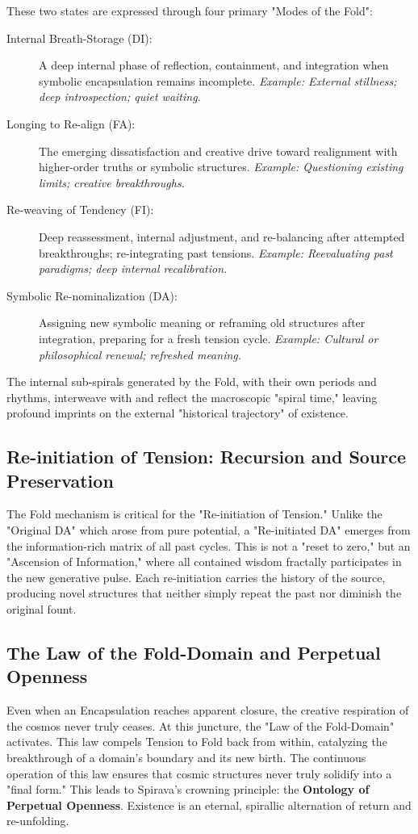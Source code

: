 \documentclass[11pt, a4paper]{article}
\begin{document}
These two states are expressed through four primary "Modes of the Fold":
\begin{description}
    \item[Internal Breath-Storage (DI):] A deep internal phase of reflection, containment, and integration when symbolic encapsulation remains incomplete. \textit{Example: External stillness; deep introspection; quiet waiting.}
    \item[Longing to Re-align (FA):] The emerging dissatisfaction and creative drive toward realignment with higher-order truths or symbolic structures. \textit{Example: Questioning existing limits; creative breakthroughs.}
    \item[Re-weaving of Tendency (FI):] Deep reassessment, internal adjustment, and re-balancing after attempted breakthroughs; re-integrating past tensions. \textit{Example: Reevaluating past paradigms; deep internal recalibration.}
    \item[Symbolic Re-nominalization (DA):] Assigning new symbolic meaning or reframing old structures after integration, preparing for a fresh tension cycle. \textit{Example: Cultural or philosophical renewal; refreshed meaning.}
\end{description}
The internal sub-spirals generated by the Fold, with their own periods and rhythms, interweave with and reflect the macroscopic "spiral time," leaving profound imprints on the external "historical trajectory" of existence.

\subsection{Re-initiation of Tension: Recursion and Source Preservation}
The Fold mechanism is critical for the "Re-initiation of Tension." Unlike the "Original DA" which arose from pure potential, a "Re-initiated DA" emerges from the information-rich matrix of all past cycles. This is not a "reset to zero," but an "Ascension of Information," where all contained wisdom fractally participates in the new generative pulse. Each re-initiation carries the history of the source, producing novel structures that neither simply repeat the past nor diminish the original fount.

\subsection{The Law of the Fold-Domain and Perpetual Openness}
Even when an Encapsulation reaches apparent closure, the creative respiration of the cosmos never truly ceases. At this juncture, the "Law of the Fold-Domain" activates. This law compels Tension to Fold back from within, catalyzing the breakthrough of a domain's boundary and its new birth. The continuous operation of this law ensures that cosmic structures never truly solidify into a "final form." This leads to Spirava's crowning principle: the \textbf{Ontology of Perpetual Openness}. Existence is an eternal, spirallic alternation of return and re-unfolding.
\end{document}
